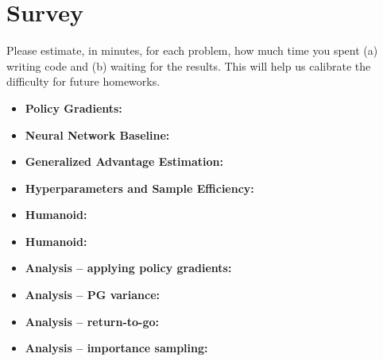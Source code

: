 \documentclass{article}
\begin{document}
\newpage\section{Survey}
\label{sec:survey}
Please estimate, in minutes, for each problem, how much time you spent (a) writing code and (b) waiting for the results. This will help us calibrate the difficulty for future homeworks. 
\begin{itemize}
    \item \textbf{Policy Gradients:}
    \item \textbf{Neural Network Baseline:}
    \item \textbf{Generalized Advantage Estimation:}
    \item \textbf{Hyperparameters and Sample Efficiency:}
    \item \textbf{Humanoid:}
    \item \textbf{Humanoid:}
    \item \textbf{Analysis -- applying policy gradients:}
    \item \textbf{Analysis -- PG variance:}
    \item \textbf{Analysis -- return-to-go:}
    \item \textbf{Analysis -- importance sampling:}
\end{itemize}
\end{document}
